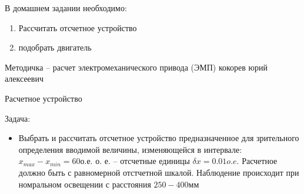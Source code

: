 \documentclass{article}
\begin{document}
В домашнем задании необходимо:
\begin{enumerate}
	\item Рассчитать отсчетное устройство
	\item подобрать двигатель
\end{enumerate}

Методичка -- расчет электромеханического привода (ЭМП) кокорев юрий алексеевич

Расчетное устройство

Задача:

\begin{itemize}
	\item Выбрать и рассчитать отсчетное устройство предназначенное для зрительного определения вводимой величины, изменяющейся в интервале: $x_{max} - x_{min} = 60 о. е.$ о. е. -- отсчетные единицы $ \delta x = 0.01 o. e.$ Расчетное должно быть с равномерной отстчетной шкалой. Наблюдение происходит при номральном освещении с расстояния $250-400мм$
\end{itemize}
\end{document}
